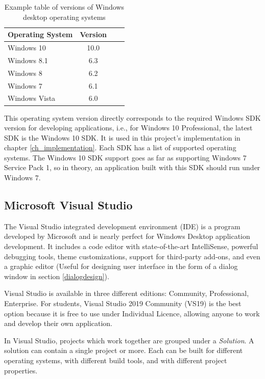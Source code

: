 \begin{table}[hbt]
\centering
\label{osversions}
\begin{tabular}{|l|c|l|l|}
\hline
Operating System & Version \\ \hline
Windows 10       & 10.0    \\ \hline
Windows 8.1      & 6.3     \\ \hline
Windows 8        & 6.2     \\ \hline
Windows 7        & 6.1     \\ \hline
Windows Vista    & 6.0     \\ \hline
\end{tabular}
\caption{Example table of versions of Windows desktop operating systems}
\end{table}

This operating system version directly corresponds to the required Windows SDK version for developing applications, i.e., for Windows 10 Professional, the latest SDK is the Windows 10 SDK. It is used in this project's implementation in chapter \ref{ch_implementation}. Each SDK has a list of supported operating systems. The Windows 10 SDK support goes as far as supporting Windows 7 Service Pack 1, so in theory, an application built with this SDK should run under Windows 7.\cite{Win10SDK}


\subsection{Microsoft Visual Studio}
\label{ch2vs19}
The Visual Studio integrated development environment (IDE) is a program developed by Microsoft and is nearly perfect for Windows Desktop application development. It includes a code editor with state-of-the-art IntelliSense, powerful debugging tools, theme customizations, support for third-party add-ons, and even a graphic editor (Useful for designing user interface in the form of a dialog window in section \ref{dialogdesign}).\cite{VStudio}

Visual Studio is available in three different editions: Community, Professional, Enterprise. For students, Visual Studio 2019 Community (VS19) is the best option because it is free to use under Individual Licence, allowing anyone to work and develop their own application.\cite{VS19TOS}

In Visual Studio, projects which work together are grouped under a \textit{Solution}. A solution can contain a single project or more. Each can be built for different operating systems, with different build tools, and with different project properties.

